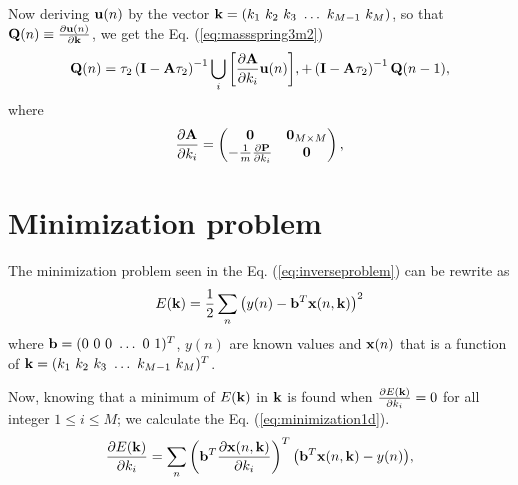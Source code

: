 \documentclass[11pt,twoside,a4paper]{article}
\newcommand{\MATRIX}[1]{\mathbf{\uppercase{#1}}}
\newcommand{\VECTOR}[1]{\mathbf{\lowercase{#1}}}
\begin{document}
Now deriving $\VECTOR{U}(n)$ by the vector $\VECTOR{k}=( k_1~ k_2~ k_3~ \hdots ~ k_{M-1}~ k_M)$,
so that $\MATRIX{Q}(n) \equiv \frac{\partial \VECTOR{U}(n)}{\partial \VECTOR{k}}$,
we get the Eq.  (\ref{eq:massspring3m2})
\begin{equation}\label{eq:massspring3m2}
 \MATRIX{Q}(n) = 
  \tau_2 \left( \mathbf{I} -\mathbf{A}\tau_2 \right)^{-1} \bigcup_{i}{ \left[ \frac{ \partial \mathbf{A} }{\partial k_{i}}  \VECTOR{U}(n)\right] },
 +\left( \mathbf{I} -\mathbf{A}\tau_2 \right)^{-1} \MATRIX{Q}(n-1),
\end{equation}
where 
\begin{equation}\label{eq:dPdkim2}
 \frac{ \partial \mathbf{A} }{\partial k_{i}} = 
\left(
\begin{matrix}
 \mathbf{0}    & \mathbf{0}_{M \times M} \\
 -\frac{1}{m}\frac{ \partial\MATRIX{P}}{\partial k_{i}} & \mathbf{0} \\
\end{matrix}\right)
,

\end{equation}
\section{Minimization problem}
The minimization problem seen in the Eq. (\ref{eq:inverseproblem}) can be rewrite as
\begin{equation}\label{eq:minimization1}
 E(\VECTOR{k})=\frac{1}{2}\sum_{n} \left( y(n)-\VECTOR{b}^{T}\VECTOR{X}(n,\VECTOR{k}) \right)^2
\end{equation}
where $\VECTOR{b}=( 0~ 0~ 0~ \hdots ~ 0~ 1)^{T}$, $y(n)$ are known values and 
$\VECTOR{X}(n)$ that is a function of $\VECTOR{k}=( k_1~ k_2~ k_3~ \hdots ~ k_{M-1}~ k_M)^{T}$.

Now, knowing that a minimum of $E(\VECTOR{k})$ in $\VECTOR{k}$ is found when 
$\frac{\partial E(\VECTOR{k})}{\partial k_i}=0$ for all integer $1 \leq i \leq M$; we calculate the
Eq. (\ref{eq:minimization1d}).
\begin{equation}\label{eq:minimization1d}
 \frac{\partial E(\VECTOR{k})}{\partial k_i}=\sum_{n}{\left( \VECTOR{b}^{T}\frac{\partial \VECTOR{X}(n,\VECTOR{k})}{\partial k_i}\right)^{T} \left( \VECTOR{b}^{T}\VECTOR{X}(n,\VECTOR{k}) -y(n)  \right) },
\end{equation}
\end{document}
